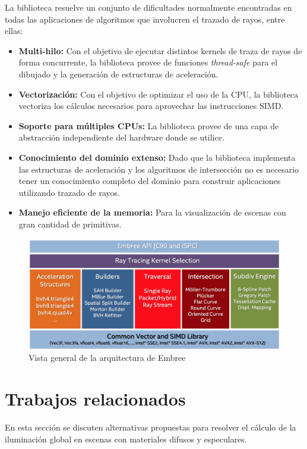 La biblioteca resuelve un conjunto de dificultades normalmente encontradas en todas las aplicaciones de algoritmos que involucren el trazado de rayos, entre ellas:

\begin{itemize}
	\item \textbf{Multi-hilo:} Con el objetivo de ejecutar distintos kernels de traza de rayos de forma concurrente, la biblioteca provee de funciones \textit{thread-safe} para el dibujado y la generación de estructuras de aceleración.
	\item \textbf{Vectorización:} Con el objetivo de optimizar el uso de la CPU, la biblioteca vectoriza los cálculos necesarios para aprovechar las instrucciones SIMD.
	\item \textbf{Soporte para múltiples CPUs:} La biblioteca provee de una capa de abstracción independiente del hardware donde se utilice.
	\item \textbf{Conocimiento del dominio extenso:} Dado que la biblioteca implementa las estructuras de aceleración y los algoritmos de intersección no es necesario tener un conocimiento completo del dominio para construir aplicaciones utilizando trazado de rayos.
	\item \textbf{Manejo eficiente de la memoria:} Para la visualización de escenas con gran cantidad de primitivas.
\end{itemize}

\vspace{5mm}
\begin{figure}[H]
	\centering
	\includegraphics[width=.8\linewidth]{assets/embree}
	\caption{Vista general de la arquitectura de Embree}
	\label{img:embree}
\end{figure}

\section{Trabajos relacionados}

En esta sección se discuten alternativas propuestas para resolver el cálculo de la iluminación global en escenas con materiales difusos y especulares.

